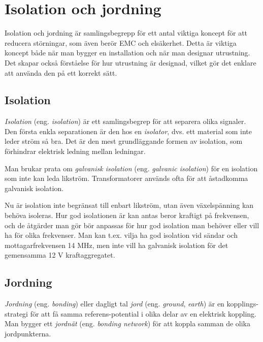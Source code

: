 \chapter{Isolation och jordning}

Isolation och jordning är samlingsbegrepp för ett antal viktiga koncept för
att reducera störningar, som även berör EMC och elsäkerhet. Detta är viktiga
koncept både när man bygger en installation och när man designar utrustning.
Det skapar också förståelse för hur utrustning är designad, vilket gör det
enklare att använda den på ett korrekt sätt.

\section{Isolation}

\emph{Isolation} (eng. \emph{isolation}) är ett samlingsbegrep för att separera
olika signaler. Den första enkla separationen är den hos en \emph{isolator},
dvs. ett material som inte leder ström så bra. Det är den mest grundläggande
formen av isolation, som förhindrar elektrisk ledning mellan ledningar.

Man brukar prata om \emph{galvanisk isolation} (eng. \emph{galvanic isolation})
för en isolation som inte kan leda likström. Transformatorer används ofta för
att åstadkomma galvanisk isolation.

Nu är isolation inte begränsat till enbart likström, utan även växelspänning
kan behöva isoleras. Hur god isolationen är kan antas beror kraftigt på
frekvensen, och de åtgärder man gör bör anpassas för hur god isolation man
behöver eller vill ha för olika frekvenser. Man kan t.ex. vilja ha god
isolation vid sändar och mottagarfrekvensen 14 MHz, men inte vill ha galvanisk
isolation för det gemensamma 12 V kraftaggregatet.

\section{Jordning}

\emph{Jordning} (eng. \emph{bonding}) eller dagligt tal \emph{jord} (eng.
\emph{ground}, \emph{earth}) är en kopplings-strategi för att få samma
referens-potential i olika delar av en elektrisk koppling. Man bygger ett
\emph{jordnät} (eng. \emph{bonding network}) för att koppla samman de olika
jordpunkterna.

